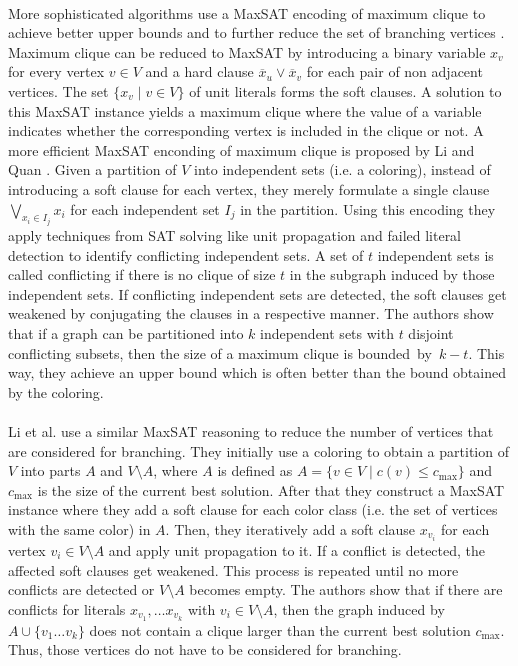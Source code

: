 \documentclass[12pt,a4paper,twoside]{scrartcl}
\numberwithin{equation}{section}
\begin{document}
\paragraph{}
More sophisticated algorithms use a MaxSAT encoding of maximum clique to achieve better upper bounds and to further reduce the set of branching vertices \cite{LiFangXu,LiJiang}. Maximum clique can be reduced to MaxSAT by introducing a binary variable $x_v$ for every vertex $v\in V$ and a hard clause $\overline{x}_u\lor\overline{x}_v$ for each pair of non adjacent vertices. The set $\{x_v\;|\;v\in V\}$ of unit literals forms the soft clauses. A solution to this MaxSAT instance yields a maximum clique where the value of a variable indicates whether the corresponding vertex is included in the clique or not. A more efficient MaxSAT enconding of maximum clique is proposed by Li and Quan \cite{LiQuan}. Given a partition of $V$ into independent sets (i.e. a coloring), instead of introducing a soft clause for each vertex, they merely formulate a single clause $\bigvee_{x_i\in I_j} x_i$ for each independent set $I_j$ in the partition. Using this encoding they apply techniques from SAT solving like unit propagation and failed literal detection to identify conflicting independent sets. A set of $t$ independent sets is called conflicting if there is no clique of size $t$ in the subgraph induced by those independent sets. If conflicting independent sets are detected, the soft clauses get weakened by conjugating the clauses in a respective manner. The authors show that if a graph can be partitioned into $k$ independent sets with $t$ disjoint conflicting subsets, then the size of a maximum clique is bounded~by~$k-t$. This way, they achieve an upper bound which is often better than the bound obtained by the coloring.

\paragraph{}
Li et al. \cite{LiMaxSat} use a similar MaxSAT reasoning to reduce the number of vertices that are considered for branching. They initially use a coloring to obtain a partition of $V$ into parts $A$ and $V\setminus A$, where $A$ is defined as $A = \{v\in V \;|\; c(v)\leq c_\text{max}\}$ and $c_\text{max}$ is the size of the current best solution. After that they construct a MaxSAT instance where they add a soft clause for each color class (i.e. the set of vertices with the same color) in $A$. Then, they iteratively add a soft clause $x_{v_i}$ for each vertex $v_i \in V\setminus A$ and apply unit propagation to it. If a conflict is detected, the affected soft clauses get weakened. This process is repeated until no more conflicts are detected or $V\setminus A$ becomes empty. The authors show that if there are conflicts for literals $x_{v_1},\dots x_{v_k}$ with $v_i\in V\setminus A$, then the graph induced by $A\cup\{v_1\dots v_k\}$ does not contain a clique larger than the current best solution $c_\text{max}$. Thus, those vertices do not have to be considered for branching.
\end{document}
